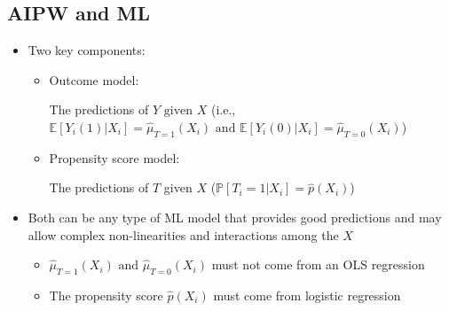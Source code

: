 \documentclass[10pt]{article}
\begin{document}
\subsection{AIPW and ML}
\begin{itemize}
    \item Two key components: 
    \begin{itemize}
        \item Outcome model: 
        
        The predictions of $Y \text{ given } X $ (i.e., $\mathbb{E}[Y_i(1)|X_i] = \hat{\mu}_{T = 1}(X_i) \text{ and } \mathbb{E}[Y_i(0)|X_i] = \hat{\mu}_{T = 0}(X_i) $)
        \item Propensity score model: 

        The predictions of $T $ given $X $ ($\mathbb{P}[T_i = 1|X_i] = \hat{p}(X_i) $)
    \end{itemize}
    \item Both can be any type of ML model that provides good predictions and may allow complex non-linearities and interactions among the $X $
    \begin{itemize}
        \item $\hat{\mu}_{T = 1}(X_i) \text{ and } \hat{\mu}_{T = 0}(X_i) $ must not come from an OLS regression
        \item The propensity score $\hat{p}(X_i) $ must come from logistic regression 
    \end{itemize}
\end{itemize}
\end{document}

